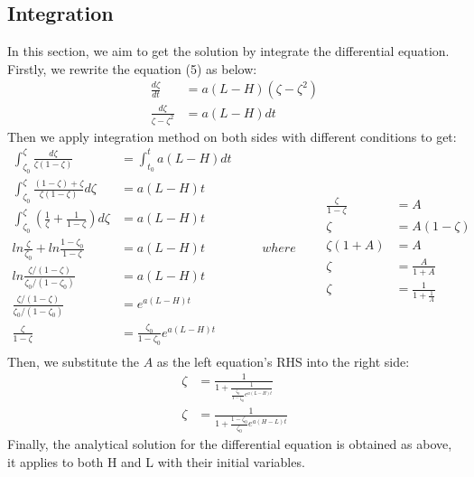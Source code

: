 \documentclass[a4paper, 12pt]{article}
\begin{document}
\subsection{Integration}
In this section, we aim to get the solution by integrate the differential equation. Firstly, we rewrite the equation (5) as below:
\vspace{-3mm}
\begin{equation}
\begin{split}
	\frac{d \zeta}{dt} &= a(L-H)( \zeta - \zeta^{2}) \\
	\frac{d \zeta}{\zeta-\zeta^{2}}&=a(L-H)dt
\end{split}
\end{equation}
Then we apply integration method on both sides with different conditions to get:
\vspace{-3mm}
\begin{equation}
	\begin{split}
		\int_{\zeta_{0}}^{\zeta} \frac{d\zeta}{\zeta(1-\zeta)} &= \int_{t_{0}}^{t} a(L-H)dt \\
		\int_{\zeta_{0}}^{\zeta} \frac{(1-\zeta)+\zeta}{\zeta(1-\zeta)}d\zeta & = a(L-H)t \\
		\int_{\zeta_{0}}^{\zeta} (\frac{1}{\zeta} + \frac{1}{1-\zeta})d\zeta &= a(L-H)t \\
		ln\frac{\zeta}{\zeta_{0}} + ln\frac{1-\zeta_{0}}{1-\zeta} & = a(L-H)t \\
		ln\frac{\zeta/(1-\zeta)}{\zeta_{0}/(1-\zeta_{0})} & = a(L-H)t \\
		\frac{\zeta/(1-\zeta)}{\zeta_{0}/(1-\zeta_{0})} & = e^{a(L-H)t} \\
		\frac{\zeta}{1-\zeta} & = \frac{\zeta_{0}}{1-\zeta_{0}}e^{a(L-H)t} \\
	\end{split}
	\qquad where \qquad
	\begin{split}
		\frac{\zeta}{1-\zeta} &= A \\
		\zeta & = A (1-\zeta) \\
		\zeta (1+A) & = A \\
		\zeta & = \frac{A}{1+A} \\
		\zeta & = \frac{1}{1 + \frac{1}{A}}
	\end{split}
\end{equation}
Then, we substitute the $A$ as the left equation's RHS into the right side:
\begin{equation}
\begin{split}
	\zeta &= \frac{1}{1+\frac{1}{\frac{\zeta_{0}}{1-\zeta_{0}}e^{a(L-H)t}}} \\
	\zeta &= \frac{1}{1+\frac{1-\zeta_{0}}{\zeta_{0}}e^{a(H-L)t}}
\end{split}
\end{equation}
Finally, the analytical solution for the differential equation is obtained as above, it applies to both H and L with their initial variables.
\end{document}
